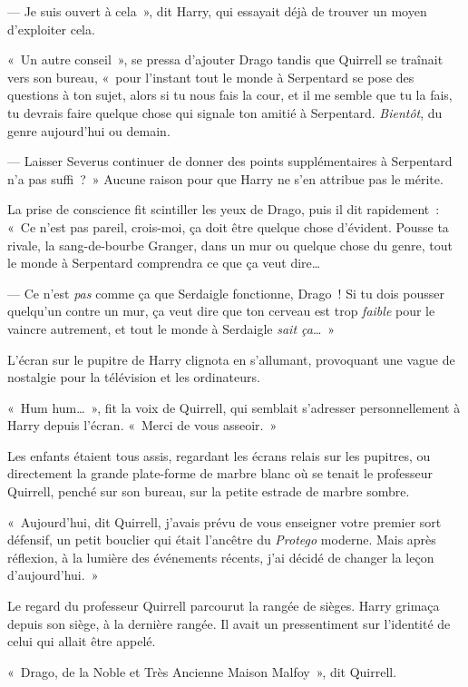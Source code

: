 --- Je suis ouvert à cela~», dit Harry, qui essayait déjà de trouver un moyen d'exploiter cela.

«~Un autre conseil~», se pressa d'ajouter Drago tandis que Quirrell se traînait vers son bureau, «~pour l'instant tout le monde à Serpentard se pose des questions à ton sujet, alors si tu nous fais la cour, et il me semble que tu la fais, tu devrais faire quelque chose qui signale ton amitié à Serpentard.
\emph{Bientôt}, du genre aujourd'hui ou demain.

--- Laisser Severus continuer de donner des points supplémentaires à Serpentard n'a pas suffi~?~»
Aucune raison pour que Harry ne s'en attribue pas le mérite.

La prise de conscience fit scintiller les yeux de Drago, puis il dit rapidement~:
«~Ce n'est pas pareil, crois-moi, ça doit être quelque chose d'évident.
Pousse ta rivale, la sang-de-bourbe Granger, dans un mur ou quelque chose du genre, tout le monde à Serpentard comprendra ce que ça veut dire…

--- Ce n'est \emph{pas} comme ça que Serdaigle fonctionne, Drago~!
Si tu dois pousser quelqu'un contre un mur, ça veut dire que ton cerveau est trop \emph{faible} pour le vaincre autrement, et tout le monde à Serdaigle \emph{sait ça}…~»

L'écran sur le pupitre de Harry clignota en s'allumant, provoquant une vague de nostalgie pour la télévision et les ordinateurs.

«~Hum hum…~», fit la voix de Quirrell, qui semblait s'adresser personnellement à Harry depuis l'écran.
«~Merci de vous asseoir.~»

\later

Les enfants étaient tous assis, regardant les écrans relais sur les pupitres, ou directement la grande plate-forme de marbre blanc où se tenait le professeur Quirrell, penché sur son bureau, sur la petite estrade de marbre sombre.

«~Aujourd'hui, dit Quirrell, j'avais prévu de vous enseigner votre premier sort défensif, un petit bouclier qui était l'ancêtre du \emph{Protego} moderne.
Mais après réflexion, à la lumière des événements récents, j'ai décidé de changer la leçon d'aujourd'hui.~»

Le regard du professeur Quirrell parcourut la rangée de sièges.
Harry grimaça depuis son siège, à la dernière rangée.
Il avait un pressentiment sur l'identité de celui qui allait être appelé.

«~Drago, de la Noble et Très Ancienne Maison Malfoy~», dit Quirrell.

